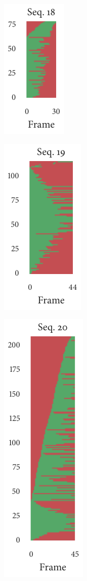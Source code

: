 \begin{figure}[t]
\begin{subfigure}[b]{0.2\textwidth}
		\includegraphics{missingness_sequence18.pdf}
	\end{subfigure}%
	\begin{subfigure}[b]{0.2\textwidth}
		\centering
		\includegraphics{missingness_sequence19.pdf}
	\end{subfigure}%
	\begin{subfigure}[b]{0.2\textwidth}
		\centering
		\includegraphics{missingness_sequence20.pdf}

\end{subfigure}
\end{figure}
